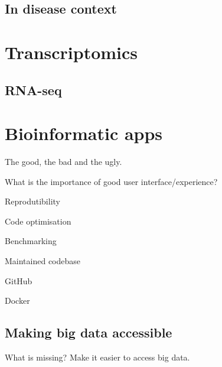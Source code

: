 \subsection{In disease context}

\section{Transcriptomics}

\subsection{RNA-seq}

\section{Bioinformatic apps}

The good, the bad and the ugly.

What is the importance of good user interface/experience?

Reprodutibility

Code optimisation

Benchmarking

Maintained codebase

GitHub

Docker

\subsection{Making big data accessible}

What is missing? Make it easier to access big data.